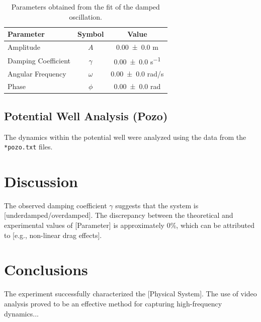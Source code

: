 \documentclass[a4paper,11pt]{article}
\begin{document}
\begin{table}[H]
    \centering
    \begin{tabular}{lcc}
        \toprule
        Parameter & Symbol & Value \\
        \midrule
        Amplitude & $A$ & \num{0.00(0)} \unit{m} \\
        Damping Coefficient & $\gamma$ & \num{0.00(0)} \unit{s^{-1}} \\
        Angular Frequency & $\omega$ & \num{0.00(0)} \unit{rad/s} \\
        Phase & $\phi$ & \num{0.00(0)} \unit{rad} \\
        \bottomrule
    \end{tabular}
    \caption{Parameters obtained from the fit of the damped oscillation.}
    \label{tab:fit_results}
\end{table}

\subsection{Potential Well Analysis (Pozo)}
The dynamics within the potential well were analyzed using the data from the \texttt{*pozo.txt} files. 

\section{Discussion}
The observed damping coefficient $\gamma$ suggests that the system is [underdamped/overdamped]. The discrepancy between the theoretical and experimental values of [Parameter] is approximately \num{0}\%, which can be attributed to [e.g., non-linear drag effects].

\section{Conclusions}
The experiment successfully characterized the [Physical System]. The use of video analysis proved to be an effective method for capturing high-frequency dynamics...
\end{document}
